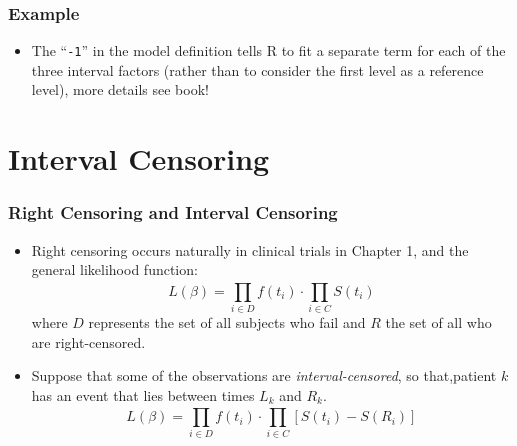 \documentclass{beamer}
\newcommand{\empr}[1]{{\emph{\color{red}#1}}}
\begin{document}
\pagebreak
\begin{frame}[fragile]
\frametitle{Example}
\begin{itemize}
\begin{Verbatim}
Coefficients:                Estimate  Std. Error  z value   Pr 
(>|z|)
factor(diagGrp)1   -3.2942   1.0370    -3.177      0.00149 **
factor(diagGrp)2   -1.7463   0.8569    -2.038      0.04156 *
factor(diagGrp)3   -1.0912   1.5949    -0.684      0.49389
trt                -1.3937   1.2425    -1.122      0.26199
---
Signif. codes:  0*** 0.001 ** 0.01 * 0.05 . 0.1    1
\end{Verbatim}
\item The ``\texttt{-1}'' in the model definition tells R to fit a separate term for each of the three interval factors (rather than to consider the first level as a reference level), more details see book!
\end{itemize}
\end{frame}

\section{Interval Censoring}
\begin{frame}
\frametitle{Right Censoring and Interval Censoring}
\begin{itemize}
\item Right censoring occurs naturally in clinical trials in Chapter 1, and  the general likelihood function:
\begin{equation}
L(\beta) = \prod\limits_{i \in D}^{}f(t_i)\cdot \prod\limits_{i \in C}^{}S(t_i)  
\end{equation}
where $D$ represents the set of all subjects who fail and $R$ the set of all who are right-censored.
\item  Suppose that some of the observations are \empr{interval-censored}, so that,patient $k$ has an event that lies between times $L_k$ and $R_k$.
\begin{equation}
L(\beta) = \prod\limits_{i \in D}^{}f(t_i)\cdot \prod\limits_{i \in C}^{}[S(t_i) - S(R_i)]  
\end{equation}
\end{itemize}
\end{frame}
\end{document}
